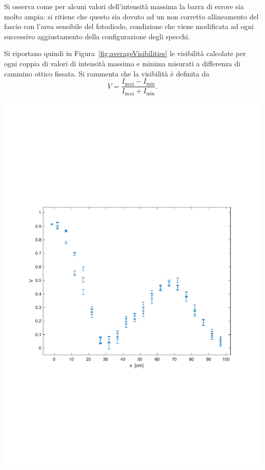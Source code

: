 \documentclass[10pt,oneside,a4paper]{article}
\newenvironment{Figure}
  {\par\medskip\noindent\minipage{\linewidth}}
  {\endminipage\par\medskip}
\begin{document}
\begin{multicols}{2}
Si osserva come per alcuni valori dell'intensità massima la barra di errore sia molto ampia: si ritiene che questo sia dovuto ad un non corretto allineamento del fascio con l'area sensibile del fotodiodo, condizione che viene modificata ad ogni successivo aggiustamento della configurazione degli specchi.

Si riportano quindi in Figura~\ref{fig:averageVisibilities} le visibilità calcolate per ogni coppia di valori di intensità massima e minima misurati a differenza di cammino ottico fissata. Si rammenta che la visibilità è definita da
\begin{equation}\label{eq:visibility}
V = \frac{I_\text{max} - I_\text{min}}{I_\text{max} + I_\text{min}}.
\end{equation}

\begin{Figure}
	\begin{center}
	\includegraphics[width=\linewidth]{Vall_vs_tau.pdf}
	\label{fig:averageVisibilities}
	\end{center}
\end{Figure}


\end{multicols}
\end{document}
